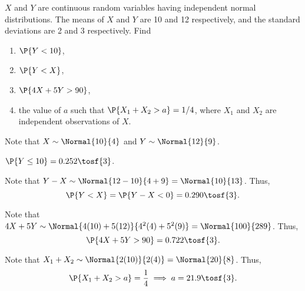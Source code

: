 \begin{problem}
    $X$ and $Y$ are continuous random variables having independent normal distributions. The means of $X$ and $Y$ are 10 and 12 respectively, and the standard deviations are 2 and 3 respectively. Find
    \begin{enumerate}
        \item $\P{Y < 10}$,
        \item $\P{Y < X}$,
        \item $\P{4X +5Y > 90}$,
        \item the value of $a$ such that $\P{X_1 + X_2 > a} = 1/4$, where $X_1$ and $X_2$ are independent observations of $X$.
    \end{enumerate}
\end{problem}
\begin{solution}
    Note that $X \sim \Normal{10}{4}$ and $Y \sim \Normal{12}{9}$.
    \begin{ppart}
        $\P{Y \leq 10} = 0.252 \tosf{3}$.
    \end{ppart}
    \begin{ppart}
        Note that $Y - X \sim \Normal{12-10}{4+9} = \Normal{10}{13}$. Thus, \[\P{Y < X} = \P{Y - X < 0} = 0.290 \tosf{3}.\]
    \end{ppart}
    \begin{ppart}
        Note that $4X + 5Y \sim \Normal{4(10) + 5(12)}{4^2 (4) + 5^2 (9)} = \Normal{100}{289}$. Thus, \[\P{4X + 5Y > 90} = 0.722 \tosf{3}.\]
    \end{ppart}
    \begin{ppart}
        Note that $X_1 + X_2 \sim \Normal{2(10)}{2(4)} = \Normal{20}{8}$. Thus, \[\P{X_1 + X_2 > a} = \frac14 \implies a = 21.9 \tosf{3}.\]
    \end{ppart}
\end{solution}

